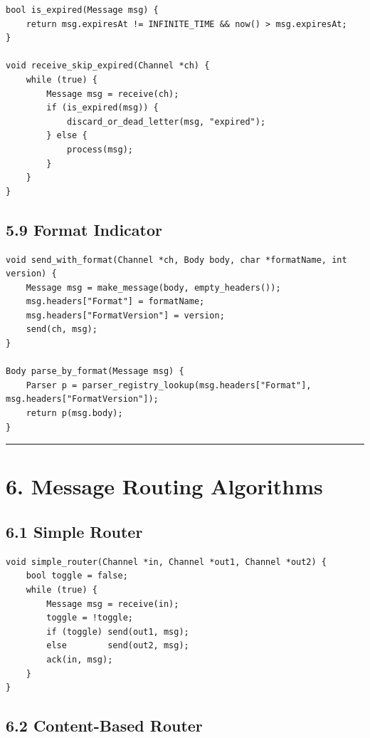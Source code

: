 \documentclass[11pt]{article}
\begin{document}
\begin{verbatim}
bool is_expired(Message msg) {
    return msg.expiresAt != INFINITE_TIME && now() > msg.expiresAt;
}

void receive_skip_expired(Channel *ch) {
    while (true) {
        Message msg = receive(ch);
        if (is_expired(msg)) {
            discard_or_dead_letter(msg, "expired");
        } else {
            process(msg);
        }
    }
}
\end{verbatim}

\subsection{5.9 Format Indicator}\label{format-indicator}

\begin{verbatim}
void send_with_format(Channel *ch, Body body, char *formatName, int version) {
    Message msg = make_message(body, empty_headers());
    msg.headers["Format"] = formatName;
    msg.headers["FormatVersion"] = version;
    send(ch, msg);
}

Body parse_by_format(Message msg) {
    Parser p = parser_registry_lookup(msg.headers["Format"], msg.headers["FormatVersion"]);
    return p(msg.body);
}
\end{verbatim}

\begin{center}\rule{0.5\linewidth}{0.5pt}\end{center}

\section{6. Message Routing
Algorithms}\label{message-routing-algorithms}

\subsection{6.1 Simple Router}\label{simple-router}

\begin{verbatim}
void simple_router(Channel *in, Channel *out1, Channel *out2) {
    bool toggle = false;
    while (true) {
        Message msg = receive(in);
        toggle = !toggle;
        if (toggle) send(out1, msg);
        else        send(out2, msg);
        ack(in, msg);
    }
}
\end{verbatim}

\subsection{6.2 Content-Based Router}\label{content-based-router}
\end{document}
